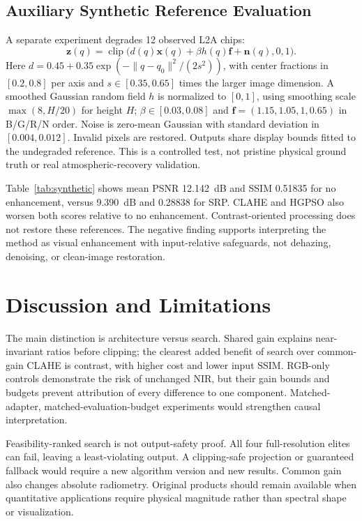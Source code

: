 \documentclass[conference]{IEEEtran}
\newcommand{\clip}{\operatorname{clip}}
\begin{document}
\subsection{Auxiliary Synthetic Reference Evaluation}

A separate experiment degrades 12 observed L2A chips:
\begin{equation}
\mathbf z(q)=\clip\big(d(q)\mathbf x(q)+\beta h(q)\mathbf f+\mathbf n(q),0,1\big).
\end{equation}
Here $d=0.45+0.35\exp(-\|q-q_0\|^2/(2s^2))$, with center fractions in $[0.2,0.8]$ per axis and $s\in[0.35,0.65]$ times the larger image dimension. A smoothed Gaussian random field $h$ is normalized to $[0,1]$, using smoothing scale $\max(8,H/20)$ for height $H$; $\beta\in[0.03,0.08]$ and $\mathbf f=(1.15,1.05,1,0.65)$ in B/G/R/N order. Noise is zero-mean Gaussian with standard deviation in $[0.004,0.012]$. Invalid pixels are restored. Outputs share display bounds fitted to the undegraded reference. This is a controlled test, not pristine physical ground truth or real atmospheric-recovery validation.

Table~\ref{tab:synthetic} shows mean PSNR 12.142~dB and SSIM 0.51835 for no enhancement, versus 9.390~dB and 0.28838 for SRP. CLAHE and HGPSO also worsen both scores relative to no enhancement. Contrast-oriented processing does not restore these references. The negative finding supports interpreting the method as visual enhancement with input-relative safeguards, not dehazing, denoising, or clean-image restoration.

\section{Discussion and Limitations}
\label{sec:discussion}
The main distinction is architecture versus search. Shared gain explains near-invariant ratios before clipping; the clearest added benefit of search over common-gain CLAHE is contrast, with higher cost and lower input SSIM. RGB-only controls demonstrate the risk of unchanged NIR, but their gain bounds and budgets prevent attribution of every difference to one component. Matched-adapter, matched-evaluation-budget experiments would strengthen causal interpretation.

Feasibility-ranked search is not output-safety proof. All four full-resolution elites can fail, leaving a least-violating output. A clipping-safe projection or guaranteed fallback would require a new algorithm version and new results. Common gain also changes absolute radiometry. Original products should remain available when quantitative applications require physical magnitude rather than spectral shape or visualization.
\end{document}
